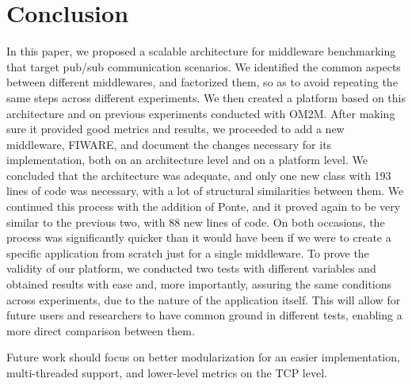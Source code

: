 \documentclass[conference]{IEEEtran}
\begin{document}
\section{Conclusion}

In this paper, we proposed a scalable architecture for middleware benchmarking that target pub/sub communication scenarios. We identified the common aspects between different middlewares, and factorized them, so as to avoid repeating the same steps across different experiments. We then created a platform based on this architecture and on previous experiments conducted with OM2M. After making sure it provided good metrics and results, we proceeded to add a new middleware, FIWARE, and document the changes necessary for its implementation, both on an architecture level and on a platform level. We concluded that the architecture was adequate, and only one new class with 193 lines of code was necessary, with a lot of structural similarities between them. We continued this process with the addition of Ponte, and it proved again to be very similar to the previous two, with 88 new lines of code. On both occasions, the process was significantly quicker than it would have been if we were to create a specific application from scratch just for a single middleware. To prove the validity of our platform, we conducted two tests with different variables and obtained results with ease and, more importantly, assuring the same conditions across experiments, due to the nature of the application itself. This will allow for future users and researchers to have common ground in different tests, enabling a more direct comparison between them.

Future work should focus on better modularization for an easier implementation, multi-threaded support, and lower-level metrics on the TCP level. 



%
%
%





\end{document}
